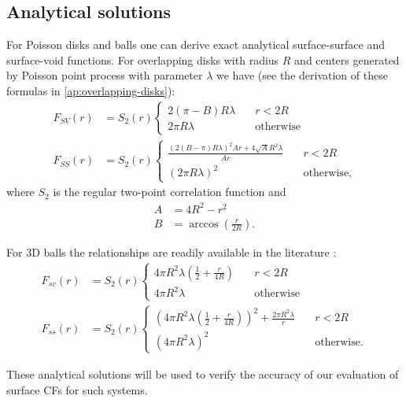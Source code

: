 \documentclass[reprint,amsmath,amssymb,aps,pre,showkeys,showpacs]{revtex4-1}
\begin{document}
\subsection{Analytical solutions}
For Poisson disks and balls one can derive exact analytical surface-surface and
surface-void functions. For overlapping disks with radius $R$ and centers
generated by Poisson point process with parameter $\lambda$ we have (see the
derivation of these formulas in \cref{ap:overlapping-disks}):
\begin{align}
  F_{SV}(r) &= S_2(r) \left\{
  \begin{array}{ll}
    2(\pi - B)R \lambda & \quad r<2R \\
    2\pi R \lambda & \quad \text{otherwise}
  \end{array} \right. \label{eq:fsv_final} \\
  F_{SS}(r) &= S_2(r) \left\{
  \begin{array}{ll}
    \frac{(2(B-\pi)R\lambda)^2Ar + 4\sqrt{A}R^2\lambda}{Ar} & \quad r<2R \\
    (2\pi R\lambda)^2 & \quad \text{otherwise},
  \end{array} \right. \label{eq:fss_final}
\end{align}
where $S_2$ is the regular two-point correlation function and
\begin{align*}
  A &= 4R^2 - r^2 \\
  B &= \arccos(\frac{r}{2R}).
\end{align*}

For 3D balls the relationships are readily available in the literature
\cite{Torquato_book,ma2018SS}:
\begin{align*}
  F_{sv}(r) &= S_2(r) \left\{
  \begin{array}{ll}
    4\pi R^2\lambda(\frac{1}{2} + \frac{r}{4R}) & \quad r<2R \\
    4\pi R^2\lambda & \quad \text{otherwise}
  \end{array} \right. \\
  F_{ss}(r) &= S_2(r) \left\{
  \begin{array}{ll}
    {(4\pi R^2 \lambda (\frac{1}{2} + \frac{r}{4R}))^2 + \frac{2\pi R^2 \lambda}{r}} & \quad r<2R \\
    (4\pi R^2 \lambda)^2 & \quad \text{otherwise}.
  \end{array} \right.
\end{align*}

These analytical solutions will be used to verify the accuracy of our evaluation
of surface CFs for such systems.
\end{document}
